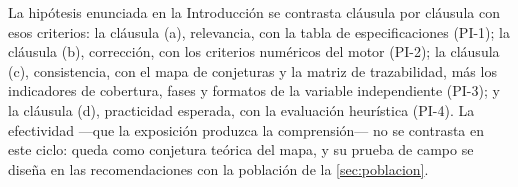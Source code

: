 La hipótesis enunciada en la Introducción se contrasta cláusula por cláusula con esos criterios: la cláusula (a), relevancia, con la tabla de especificaciones (PI-1); la cláusula (b), corrección, con los criterios numéricos del motor (PI-2); la cláusula (c), consistencia, con el mapa de conjeturas y la matriz de trazabilidad, más los indicadores de cobertura, fases y formatos de la variable independiente (PI-3); y la cláusula (d), practicidad esperada, con la evaluación heurística (PI-4). La efectividad —que la exposición produzca la comprensión— no se contrasta en este ciclo: queda como conjetura teórica del mapa, y su prueba de campo se diseña en las recomendaciones con la población de la \autoref{sec:poblacion}.
